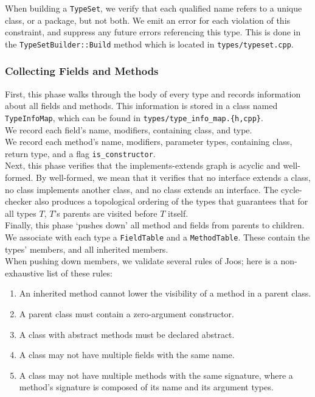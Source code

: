 \documentclass[12pt, titlepage]{article}
\newcommand{\z}[1]{\texttt{#1}}
\begin{document}
When building a \z{TypeSet}, we verify that each qualified name refers to a
unique class, or a package, but not both. We emit an error for each violation
of this constraint, and suppress any future errors referencing this type. This
is done in the \z{TypeSetBuilder::Build} method which is located in
\z{types/typeset.cpp}.

\subsubsection{Collecting Fields and Methods}\label{subsubsec:fields}

First, this phase walks through the body of every type and records information
about all fields and methods. This information is stored in a class named
\z{TypeInfoMap}, which can be found in \z{types/type\_info\_map.\{h,cpp\}}. \\
We record each field's name, modifiers, containing class, and type. \\
We record each method's name, modifiers, parameter types, containing class,
return type, and a flag \z{is\_constructor}.\\

Next, this phase verifies that the implements-extends graph is acyclic and
well-formed. By well-formed, we mean that it verifies that no interface extends
a class, no class implements another class, and no class extends an interface.
The cycle-checker also produces a topological ordering of the types that
guarantees that for all types $T$, $T$'s parents are visited before $T$
itself.\\

Finally, this phase `pushes down' all method and fields from parents to
children. We associate with each type a \z{FieldTable} and a \z{MethodTable}. These
contain the types' members, and all inherited members.\\
When pushing down members, we validate several rules of Joos; here is a
non-exhaustive list of these rules:
\begin{enumerate}
  \item An inherited method cannot lower the visibility of a method in a parent
  class.

  \item A parent class must contain a zero-argument constructor.

  \item A class with abstract methods must be declared abstract.

  \item A class may not have multiple fields with the same name.

  \item A class may not have multiple methods with the same signature, where a
    method's signature is composed of its name and its argument types.
\end{enumerate}
\end{document}
